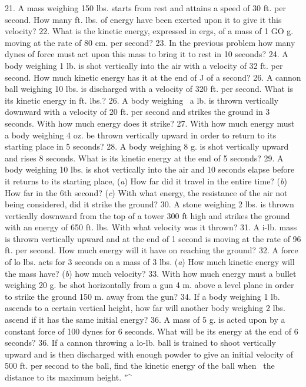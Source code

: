 21. A mass weighing 150 lbs. starts from rest and attains a speed of 30 ft. per second. How many ft. lbs. of energy have been exerted upon it to give it this velocity?
22. What is the kinetic energy, expressed in ergs, of a mass of 1 GO g. moving at the rate of 80 cm. per second?
23. In the previous problem how many dynes of force must act upon this mass to bring it to rest in 10 seconds?
24. A body weighing 1 lb. is shot vertically into the air with a velocity of 32 ft. per second. How much kinetic energy has it at the end of J of a second?
26. A cannon ball weighing 10 lbs. is discharged with a velocity of 320 ft. per second. What is its kinetic energy in ft. lbs.?
26. A body weighing \ a lb. is thrown vertically downward with a velocity of 20 ft. per second and strikes the ground in 3 seconds. With how much energy does it strike?
27. With how much energy must a body weighing 4 oz. be thrown vertically upward in order to return to its starting place in 5 seconds?
28. A body weighing 8 g. is shot vertically upward and rises 8 seconds. What is its kinetic energy at the end of 5 seconds?
29. A body weighing 10 lbs. is shot vertically into the air and 10 seconds elapse before it returns to its starting place, (\emph{a}) How far did it travel in the entire time? (\emph{b}) How far in the 6th second? (\emph{c}) With what energy, the resistance of the air not being considered, did it strike the ground?
30. A stone weighing 2 lbs. is thrown vertically downward from the top of a tower 300 ft high and strikes the ground with an energy of 650 ft. lbs. With what velocity was it thrown?
31. A i-lb. mass is thrown vertically upward and at the end of 1 second is moving at the rate of 96 ft. per second. How much energy will it have on reaching the ground?
32. A force of lo lbs. acts for 3 seconds on a mass of 3 lbs. (\emph{a}) How much kinetic energy will the mass have? (\emph{b}) how much velocity?
33. With how much energy must a bullet weighing 20 g. be shot horizontally from a gun 4 m. above a level plane in order to strike the ground 150 m. away from the gun?
34. If a body weighing 1 lb. ascends to a certain vertical height, how far will another body weighing 2 lbs. ascend if it has the same initial energy?
36. A mass of 5 g. is acted upon by a constant force of 100 dynes for 6 seconds. What will be its energy at the end of 6 seconds?
36. If a cannon throwing a lo-lb. ball is trained to shoot vertically upward and is then discharged with enough powder to give an initial velocity of 500 ft. per second to the ball, find the kinetic energy of the ball when \ the distance to its maximum height. "^
